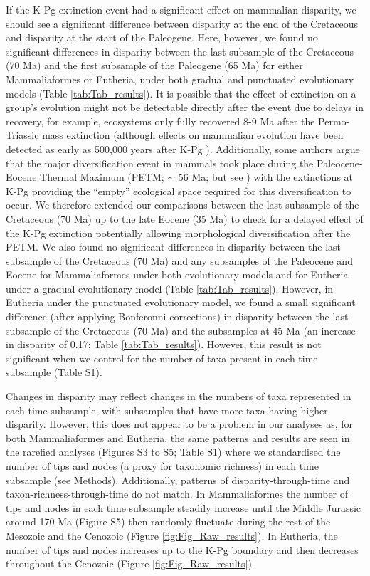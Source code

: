 \documentclass[10pt,letterpaper]{article}
\begin{document}
If the K-Pg extinction event had a significant effect on mammalian disparity, we should see a significant difference between disparity at the end of the Cretaceous and disparity at the start of the Paleogene.
Here, however, we found no significant differences in disparity between the last subsample of the Cretaceous (70 Ma) and the first subsample of the Paleogene (65 Ma) for either Mammaliaformes or Eutheria, under both gradual and punctuated evolutionary models (Table \ref{tab:Tab_results}). 
It is possible that the effect of extinction on a group's evolution might not be detectable directly after the event due to delays in recovery, for example, ecosystems only fully recovered 8-9 Ma after the Permo-Triassic mass extinction \cite{chen2012timing} (although effects on mammalian evolution have been detected as early as 500,000 years after K-Pg \cite{Wilson2013}).
Additionally, some authors argue that the major diversification event in mammals took place during the Paleocene-Eocene Thermal Maximum (PETM; $\sim$ 56 Ma; \cite{bininda-emondsthe2007} but see \cite{meredithimpacts2011,Stadler12042011}) with the extinctions at K-Pg providing the ``empty'' ecological space required for this diversification to occur.
We therefore extended our comparisons between the last subsample of the Cretaceous (70 Ma) up to the late Eocene (35 Ma) to check for a delayed effect of the K-Pg extinction potentially allowing morphological diversification after the PETM. 
We also found no significant differences in disparity between the last subsample of the Cretaceous (70 Ma) and any subsamples of the Paleocene and Eocene for Mammaliaformes under both evolutionary models and for Eutheria under a gradual evolutionary model (Table \ref{tab:Tab_results}).
However, in Eutheria under the punctuated evolutionary model, we found a small significant difference (after applying Bonferonni corrections) in disparity between the last subsample of the Cretaceous (70 Ma) and the subsamples at 45 Ma (an increase in disparity of 0.17; Table \ref{tab:Tab_results}).
However, this result is not significant when we control for the number of taxa present in each time subsample (Table S1). 

Changes in disparity may reflect changes in the numbers of taxa represented in each time subsample, with subsamples that have more taxa having higher disparity. 
However, this does not appear to be a problem in our analyses as, for both Mammaliaformes and Eutheria, the same patterns and results are seen in the rarefied analyses (Figures S3 to S5; Table S1) where we standardised the number of tips and nodes (a proxy for taxonomic richness) in each time subsample (see Methods).
Additionally, patterns of disparity-through-time and taxon-richness-through-time do not match.
In Mammaliaformes the number of tips and nodes in each time subsample steadily increase until the Middle Jurassic around 170 Ma (Figure S5) then randomly fluctuate during the rest of the Mesozoic and the Cenozoic (Figure \ref{fig:Fig_Raw_results}).
In Eutheria, the number of tips and nodes increases up to the K-Pg boundary and then decreases throughout the Cenozoic (Figure \ref{fig:Fig_Raw_results}).
\end{document}
